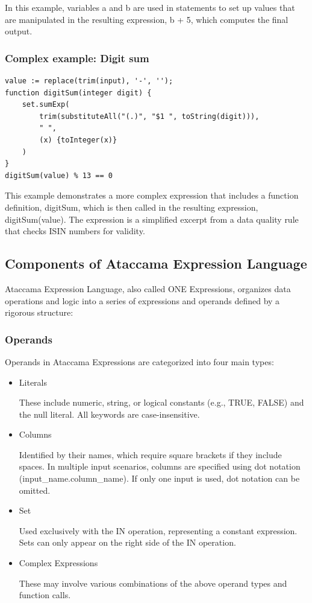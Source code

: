 In this example, variables a and b are used in statements to set up values that are manipulated in the resulting expression, b + 5, which computes the final output.

\subsubsection{Complex example: Digit sum}

\begin{verbatim}
value := replace(trim(input), '-', '');
function digitSum(integer digit) { 
    set.sumExp(
        trim(substituteAll("(.)", "$1 ", toString(digit))), 
        " ", 
        (x) {toInteger(x)}
    )
}
digitSum(value) % 13 == 0
\end{verbatim}

This example demonstrates a more complex expression that includes a function definition, digitSum, which is then called in the resulting expression, digitSum(value). The expression is a simplified excerpt from a data quality rule that checks ISIN numbers for validity.

\subsection{Components of Ataccama Expression Language}

Ataccama Expression Language, also called ONE Expressions, organizes data operations and logic into a series of expressions and operands defined by a rigorous structure:


    \subsubsection{Operands}
    
    Operands in Ataccama Expressions are categorized into four main types:

    \begin{itemize}
        \item  Literals
        
        These include numeric, string, or logical constants (e.g., TRUE, FALSE) and the null literal. All keywords are case-insensitive.

        \item Columns
        
        Identified by their names, which require square brackets if they include spaces. In multiple input scenarios, columns are specified using dot notation (input\_name.column\_name). If only one input is used, dot notation can be omitted.

        \item Set
        
        Used exclusively with the IN operation, representing a constant expression. Sets can only appear on the right side of the IN operation.
    
        \item Complex Expressions
        
        These may involve various combinations of the above operand types and function calls.
    \end{itemize}

